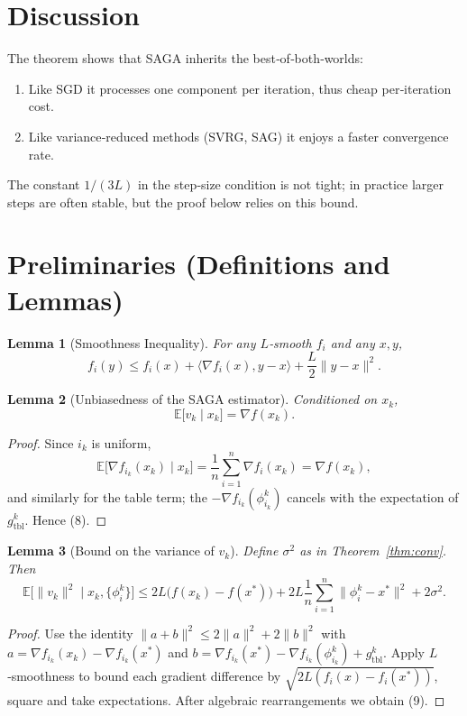 \documentclass[11pt]{article}
\newtheorem{lemma}{Lemma}
\newcommand{\E}{\mathbb{E}}
\begin{document}
\section*{Discussion}
The theorem shows that SAGA inherits the best‑of‑both‑worlds:
\begin{enumerate}
\item Like SGD it processes one component per iteration, thus cheap per‑iteration cost.
\item Like variance‑reduced methods (SVRG, SAG) it enjoys a faster convergence rate.
\end{enumerate}
The constant $1/(3L)$ in the step‑size condition is not tight; in practice
larger steps are often stable, but the proof below relies on this bound.

\section*{Preliminaries (Definitions and Lemmas)}
\begin{lemma}[Smoothness Inequality]\label{lem:smooth}
For any $L$‑smooth $f_i$ and any $x,y$,
\[
f_i(y)\le f_i(x)+\langle\nabla f_i(x),y-x\rangle+\frac{L}{2}\|y-x\|^{2}.
\tag{7}
\]
\end{lemma}
\begin{lemma}[Unbiasedness of the SAGA estimator]\label{lem:unbiased}
Conditioned on $x_{k}$,
\[
\E\bigl[v_{k}\mid x_{k}\bigr]=\nabla f(x_{k}).
\tag{8}
\]
\end{lemma}
\begin{proof}
Since $i_{k}$ is uniform,
\[
\E\bigl[\nabla f_{i_{k}}(x_{k})\mid x_{k}\bigr]=\frac1n\sum_{i=1}^{n}\nabla f_i(x_{k})=\nabla f(x_{k}),
\]
and similarly for the table term; the $-\nabla f_{i_{k}}(\phi^{k}_{i_{k}})$ cancels
with the expectation of $g^{k}_{\text{tbl}}$. Hence (8). \qedhere
\end{proof}
\begin{lemma}[Bound on the variance of $v_{k}$]\label{lem:var}
Define $\sigma^{2}$ as in Theorem~\ref{thm:conv}. Then
\[
\E\bigl[\|v_{k}\|^{2}\mid x_{k},\{\phi^{k}_{i}\}\bigr]
\le 2L\bigl(f(x_{k})-f(x^{*})\bigr)
+2L\frac{1}{n}\sum_{i=1}^{n}\bigl\|\phi^{k}_{i}-x^{*}\bigr\|^{2}
+2\sigma^{2}.
\tag{9}
\]
\end{lemma}
\begin{proof}
Use the identity $\|a+b\|^{2}\le2\|a\|^{2}+2\|b\|^{2}$ with
$a=\nabla f_{i_{k}}(x_{k})-\nabla f_{i_{k}}(x^{*})$ and
$b=\nabla f_{i_{k}}(x^{*})-\nabla f_{i_{k}}(\phi^{k}_{i_{k}})+g^{k}_{\text{tbl}}$.
Apply $L$‑smoothness to bound each gradient difference by $\sqrt{2L(f_i(x)-f_i(x^{*}))}$,
square and take expectations. After algebraic rearrangements we obtain (9). \qedhere
\end{proof}
\end{document}
